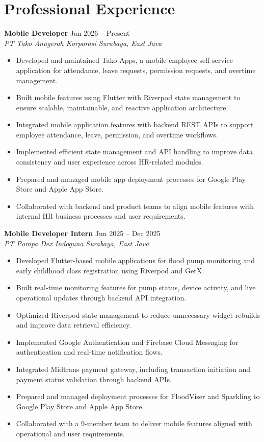 \documentclass[11pt,a4paper]{article}
\newcommand{\resumeEntry}[4]{%
  {\textbf{\color{primary}#1}} \hfill #2\\
  {\textit{\color{accent}#3}} \hfill {\textit{\color{accent}#4}}
}
\begin{document}
\section*{Professional Experience}

\resumeEntry{Mobile Developer}{Jan 2026 -- Present}{PT Tako Anugerah Korporasi}{Surabaya, East Java}
\begin{itemize}
    \item Developed and maintained Tako Apps, a mobile employee self-service application for attendance, leave requests, permission requests, and overtime management.
    \item Built mobile features using Flutter with Riverpod state management to ensure scalable, maintainable, and reactive application architecture.
    \item Integrated mobile application features with backend REST APIs to support employee attendance, leave, permission, and overtime workflows.
    \item Implemented efficient state management and API handling to improve data consistency and user experience across HR-related modules.
    \item Prepared and managed mobile app deployment processes for Google Play Store and Apple App Store.
    \item Collaborated with backend and product teams to align mobile features with internal HR business processes and user requirements.
\end{itemize}

\resumeEntry{Mobile Developer Intern}{Jun 2025 -- Dec 2025}{PT Pompa Dex Indoguna}{Surabaya, East Java}
\begin{itemize}
    \item Developed Flutter-based mobile applications for flood pump monitoring and early childhood class registration using Riverpod and GetX.
    \item Built real-time monitoring features for pump status, device activity, and live operational updates through backend API integration.
    \item Optimized Riverpod state management to reduce unnecessary widget rebuilds and improve data retrieval efficiency.
    \item Implemented Google Authentication and Firebase Cloud Messaging for authentication and real-time notification flows.
    \item Integrated Midtrans payment gateway, including transaction initiation and payment status validation through backend APIs.
    \item Prepared and managed deployment processes for FloodViser and Sparkling to Google Play Store and Apple App Store.
    \item Collaborated with a 9-member team to deliver mobile features aligned with operational and user requirements.
\end{itemize}
\end{document}
